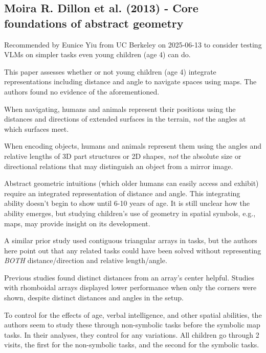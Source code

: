 \documentclass[12pt, letterpaper]{article}
\begin{document}
\begin{spacing}{1.10}
\section[Dillon et al. - Core foundations of abstract geometry]{Moira R. Dillon et al. (2013) - Core foundations of abstract geometry \cite{Dillon2013abstractgeometry}}
\label{sec:Dillon 2013 Abstract Geometry}
\leavevmode\par

Recommended by Eunice Yiu from UC Berkeley on 2025-06-13 to consider testing VLMs on simpler tasks even young children (age 4) can do.

This paper assesses whether or not young children (age 4) integrate representations including distance and angle to navigate spaces using maps. The authors found no evidence of the aforementioned.

When navigating, humans and animals represent their positions using the distances and directions of extended surfaces in the terrain, \emph{not} the angles at which surfaces meet.

When encoding objects, humans and animals represent them using the angles and relative lengths of 3D part structures or 2D shapes, \emph{not} the absolute size or directional relations that may distinguish an object from a mirror image.

Abstract geometric intuitions (which older humans can easily access and exhibit) require an integrated representation of distance and angle. This integrating ability doesn't begin to show until 6-10 years of age. It is still unclear how the ability emerges, but studying children's use of geometry in spatial symbols, e.g., maps, may provide insight on its development.

A similar prior study \cite{Huang2013maps} used contiguous triangular arrays in tasks, but the authors here point out that any related tasks could have been solved without representing \emph{BOTH} distance/direction and relative length/angle.

Previous studies found distinct distances from an array's center helpful. Studies with rhomboidal arrays displayed lower performance when only the corners were shown, despite distinct distances and angles in the setup.

To control for the effects of age, verbal intelligence, and other spatial abilities, the authors seem to study these through non-symbolic tasks before the symbolic map tasks. In their analyses, they control for any variations. All children go through 2 visits, the first for the non-symbolic tasks, and the second for the symbolic tasks.


\end{spacing}
\end{document}
